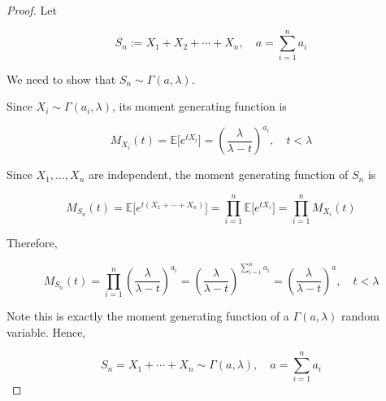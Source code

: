 \begin{proof}

Let

\[\mathit{S}_{\mathit{n}} := \mathit{X}_{1} + \mathit{X}_{2} + \cdots + \mathit{X}_{\mathit{n}},\quad\mathit{a} = \sum\limits_{\mathit{i} = 1}^{\mathit{n}}\mathit{a}_{\mathit{i}}\]

We need to show that \(\mathit{S}_{\mathit{n}} \sim \Gamma(\mathit{a},\mathit{\lambda})\).

Since \(\mathit{X}_{\mathit{i}} \sim \Gamma(\mathit{a}_{\mathit{i}},\mathit{\lambda})\), its moment generating function is

\[\mathit{M}_{\mathit{X}_{\mathit{i}}}(\mathit{t}) = \mathbb{E}\lbrack\mathit{e}^{\mathit{t}\mathit{X}_{\mathit{i}}}\rbrack = \left( \frac{\mathit{\lambda}}{\mathit{\lambda} - \mathit{t}} \right)^{\mathit{a}_{\mathit{i}}},\quad\mathit{t} < \mathit{\lambda}\]

Since \(\mathit{X}_{1},\ldots,\mathit{X}_{\mathit{n}}\) are independent, the moment generating function of \(\mathit{S}_{\mathit{n}}\) is

\[\mathit{M}_{\mathit{S}_{\mathit{n}}}(\mathit{t}) = \mathbb{E}\lbrack\mathit{e}^{\mathit{t}(\mathit{X}_{1} + \cdots + \mathit{X}_{\mathit{n}})}\rbrack = \prod\limits_{\mathit{i} = 1}^{\mathit{n}}\mathbb{E}\lbrack\mathit{e}^{\mathit{t}\mathit{X}_{\mathit{i}}}\rbrack = \prod\limits_{\mathit{i} = 1}^{\mathit{n}}\mathit{M}_{\mathit{X}_{\mathit{i}}}(\mathit{t})\]

Therefore,

\[\mathit{M}_{\mathit{S}_{\mathit{n}}}(\mathit{t}) = \prod\limits_{\mathit{i} = 1}^{\mathit{n}}\left( \frac{\mathit{\lambda}}{\mathit{\lambda} - \mathit{t}} \right)^{\mathit{a}_{\mathit{i}}} = \left( \frac{\mathit{\lambda}}{\mathit{\lambda} - \mathit{t}} \right)^{\sum_{\mathit{i} = 1}^{\mathit{n}}\mathit{a}_{\mathit{i}}} = \left( \frac{\mathit{\lambda}}{\mathit{\lambda} - \mathit{t}} \right)^{\mathit{a}},\quad\mathit{t} < \mathit{\lambda}\]

Note this is exactly the moment generating function of a \(\Gamma(\mathit{a},\mathit{\lambda})\) random variable. Hence,

\[\mathit{S}_{\mathit{n}} = \mathit{X}_{1} + \cdots + \mathit{X}_{\mathit{n}} \sim \Gamma(\mathit{a},\mathit{\lambda}),\quad\mathit{a} = \sum\limits_{\mathit{i} = 1}^{\mathit{n}}\mathit{a}_{\mathit{i}}\]

\end{proof}
